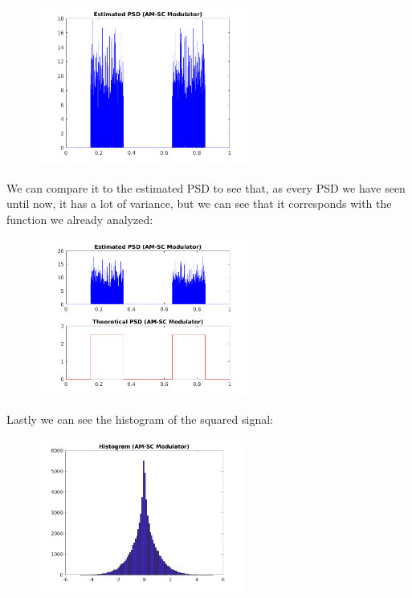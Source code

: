 \documentclass[a4paper,11pt]{article}
\begin{document}
\begin{figure}[!hp]
    \begin{center}
      \includegraphics[width=0.62\textwidth]{images/study3/R_es_am.png}
    \end{center}
\end{figure}

We can compare it to the estimated PSD to see that, as every PSD we have seen
until now, it has a lot of variance, but we can see that it corresponds with
the function we already analyzed:

\begin{figure}[!hp]
    \begin{center}
      \includegraphics[width=0.62\textwidth]{images/study3/comp_psd_am.png}
    \end{center}
\end{figure}

\newpage

Lastly we can see the histogram of the squared signal:

\begin{figure}[!hp]
    \begin{center}
      \includegraphics[width=0.6\textwidth]{images/study3/hist_am.png}
    \end{center}
\end{figure}
\end{document}
